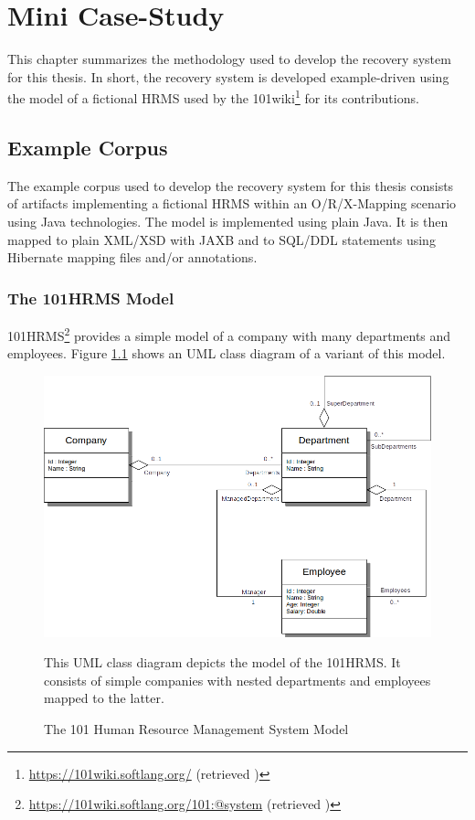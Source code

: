 \chapter{Mini Case-Study}
\label{chapter:MiniCaseStudy}
This chapter summarizes the methodology used to develop the recovery system for this thesis.
In short, the recovery system is developed example-driven using the model of a fictional \gls{HRMS} used by the 101wiki\footnote{\url{https://101wiki.softlang.org/} (retrieved )} for its contributions.

\section{Example Corpus}
\label{section:ExampleCorpus}
The example corpus used to develop the recovery system for this thesis consists of artifacts implementing a fictional \gls{HRMS} within an \gls{O/R/X-Mapping} scenario using \gls{Java} technologies.
The model is implemented using plain \Gls{Java}. 
It is then mapped to plain \gls{XML}/\gls{XSD} with \gls{JAXB} and to \gls{SQL/DDL} statements using \gls{Hibernate} mapping files and/or annotations.



\subsection{The 101HRMS Model}
\gls{101HRMS}\footnote{\url{https://101wiki.softlang.org/101:@system} (retrieved )} provides a simple model of a company with many departments and employees.
Figure \ref{figure:101HRMSModel} shows an \gls{UML} class diagram of a variant of this model.

\begin{figure}[h!]
\begin{center}
\includegraphics[scale=.5]{images/101HRMSModel.png}
\end{center}
{
\scriptsize 
This \gls{UML} class diagram depicts the model of the \gls{101HRMS}.
It consists of simple companies with nested departments and employees mapped to the latter.
}
\caption{The 101 Human Resource Management System Model}
\label{figure:101HRMSModel}
\end{figure}

